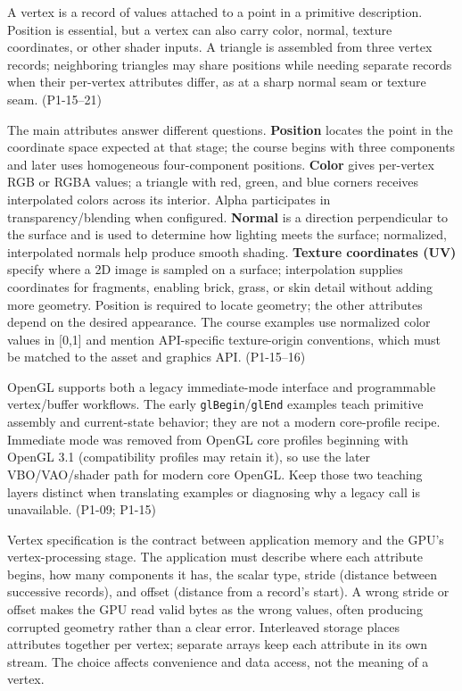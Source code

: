 A vertex is a record of values attached to a point in a primitive description. Position is essential, but a vertex can also carry color, normal, texture coordinates, or other shader inputs. A triangle is assembled from three vertex records; neighboring triangles may share positions while needing separate records when their per-vertex attributes differ, as at a sharp normal seam or texture seam. (P1-15--21)

The main attributes answer different questions. \textbf{Position} locates the point in the coordinate space expected at that stage; the course begins with three components and later uses homogeneous four-component positions. \textbf{Color} gives per-vertex RGB or RGBA values; a triangle with red, green, and blue corners receives interpolated colors across its interior. Alpha participates in transparency/blending when configured. \textbf{Normal} is a direction perpendicular to the surface and is used to determine how lighting meets the surface; normalized, interpolated normals help produce smooth shading. \textbf{Texture coordinates (UV)} specify where a 2D image is sampled on a surface; interpolation supplies coordinates for fragments, enabling brick, grass, or skin detail without adding more geometry. Position is required to locate geometry; the other attributes depend on the desired appearance. The course examples use normalized color values in {[}0,1{]} and mention API-specific texture-origin conventions, which must be matched to the asset and graphics API. (P1-15--16)

OpenGL supports both a legacy immediate-mode interface and programmable vertex/buffer workflows. The early \texttt{glBegin}/\texttt{glEnd} examples teach primitive assembly and current-state behavior; they are not a modern core-profile recipe. Immediate mode was removed from OpenGL core profiles beginning with OpenGL 3.1 (compatibility profiles may retain it), so use the later VBO/VAO/shader path for modern core OpenGL. Keep those two teaching layers distinct when translating examples or diagnosing why a legacy call is unavailable. (P1-09; P1-15)

Vertex specification is the contract between application memory and the GPU's vertex-processing stage. The application must describe where each attribute begins, how many components it has, the scalar type, stride (distance between successive records), and offset (distance from a record's start). A wrong stride or offset makes the GPU read valid bytes as the wrong values, often producing corrupted geometry rather than a clear error. Interleaved storage places attributes together per vertex; separate arrays keep each attribute in its own stream. The choice affects convenience and data access, not the meaning of a vertex.

